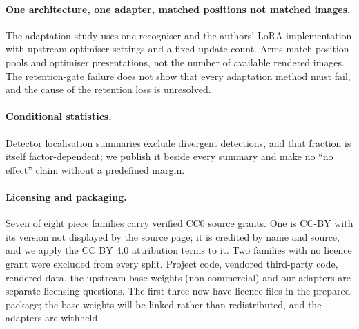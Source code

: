 \paragraph{One architecture, one adapter, matched positions not matched images.} The adaptation
study uses one recogniser and the authors' LoRA implementation with upstream optimiser settings and
a fixed update count. Arms match position pools and optimiser presentations, not the number of
available rendered images. The retention-gate failure does not show that every adaptation method
must fail, and the cause of the retention loss is unresolved.

\paragraph{Conditional statistics.} Detector localisation summaries exclude divergent detections,
and that fraction is itself factor-dependent; we publish it beside every summary and make no
``no effect'' claim without a predefined margin.

\paragraph{Licensing and packaging.} Seven of eight piece families carry verified CC0 source
grants. One is CC-BY with its version not displayed by the source page; it is credited by name
and source, and we apply the CC BY 4.0 attribution terms to it. Two families with no licence grant were
excluded from every split. Project code, vendored third-party code, rendered data, the upstream
base weights (non-commercial) and our adapters are separate licensing questions. The first three now have
licence files in the prepared package; the base weights will be linked rather than redistributed,
and the adapters are withheld.
